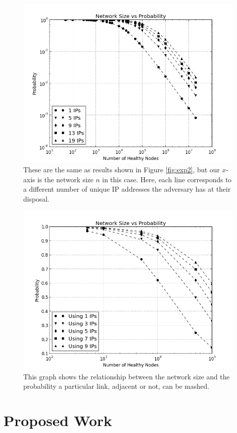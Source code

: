 \documentclass[11pt]{beamer}
\begin{document}
\begin{frame}
    
    \begin{figure}
        \centering
        \includegraphics[width=0.7\linewidth]{figs/size_prob_all}
        \caption[a]{These are the same as results shown in Figure \ref{fig:exp2}, but our $x$-axis is the network size $n$ in this case.  
            Here, each line corresponds to a different number of unique IP addresses the adversary has at their disposal.}
        \label{fig:size_prob_all}
    \end{figure}
\end{frame}

\begin{frame}
    \begin{figure}
        \centering
        \includegraphics[width=0.7\linewidth]{figs/size_occlusion_chord}
        \caption{This graph shows the relationship between the network size and the probability a particular link, adjacent or not, can be mashed.}
        \label{fig:exp3}
    \end{figure}
\end{frame}
    

\section{Proposed Work}
\end{document}
